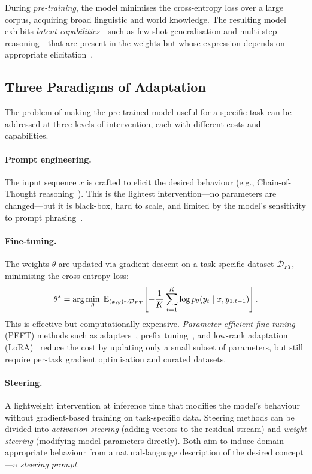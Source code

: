 During \emph{pre-training}, the model minimises the cross-entropy loss over a large corpus, acquiring broad linguistic and world knowledge. The resulting model exhibits \emph{latent capabilities}---such as few-shot generalisation and multi-step reasoning---that are present in the weights but whose expression depends on appropriate elicitation~\cite{brown2020}.

\subsection{Three Paradigms of Adaptation}
\label{subsec:adaptation-paradigms}

The problem of making the pre-trained model useful for a specific task can be addressed at three levels of intervention, each with different costs and capabilities.

\paragraph{Prompt engineering.} The input sequence $x$ is crafted to elicit the desired behaviour (e.g., Chain-of-Thought reasoning~\cite{wei2022cot}). This is the lightest intervention---no parameters are changed---but it is black-box, hard to scale, and limited by the model's sensitivity to prompt phrasing~\cite{cao2024}.

\paragraph{Fine-tuning.} The weights $\theta$ are updated via gradient descent on a task-specific dataset $\mathcal{D}_{FT}$, minimising the cross-entropy loss:
\begin{equation}\label{eq:fine-tuning}
  \theta^* = \arg\min_\theta\; \mathbb{E}_{(x,y)\sim\mathcal{D}_{FT}}\!\left[-\frac{1}{K}\sum_{t=1}^K \log p_\theta(y_t \mid x, y_{1:t-1})\right].
\end{equation}
This is effective but computationally expensive. \emph{Parameter-efficient fine-tuning} (PEFT) methods such as adapters~\cite{houlsby2019}, prefix tuning~\cite{li2021prefix}, and low-rank adaptation (LoRA)~\cite{hu2022lora} reduce the cost by updating only a small subset of parameters, but still require per-task gradient optimisation and curated datasets.

\paragraph{Steering.} A lightweight intervention at inference time that modifies the model's behaviour without gradient-based training on task-specific data. Steering methods can be divided into \emph{activation steering} (adding vectors to the residual stream) and \emph{weight steering} (modifying model parameters directly). Both aim to induce domain-appropriate behaviour from a natural-language description of the desired concept---a \emph{steering prompt}.

